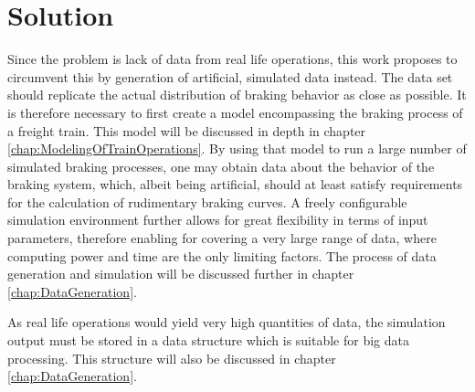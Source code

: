 \section{Solution}
\label{sec:Solution}

\par\noindent
Since the problem is lack of data from real life operations, this work proposes to circumvent this by generation of artificial, simulated data instead. The data set should replicate the actual distribution of braking behavior as close as possible. It is therefore necessary to first create a model encompassing the braking process of a freight train. This model will be discussed in depth in chapter \ref{chap:ModelingOfTrainOperations}. By using that model to run a large number of simulated braking processes, one may obtain data about the behavior of the braking system, which, albeit being artificial, should at least satisfy requirements for the calculation of rudimentary braking curves. A freely configurable simulation environment further allows for great flexibility in terms of input parameters, therefore enabling for covering a very large range of data, where computing power and time are the only limiting factors. The process of data generation and simulation will be discussed further in chapter \ref{chap:DataGeneration}.
\par
As real life operations would yield very high quantities of data, the simulation output must be stored in a data structure which is suitable for big data processing. This structure will also be discussed in chapter \ref{chap:DataGeneration}.